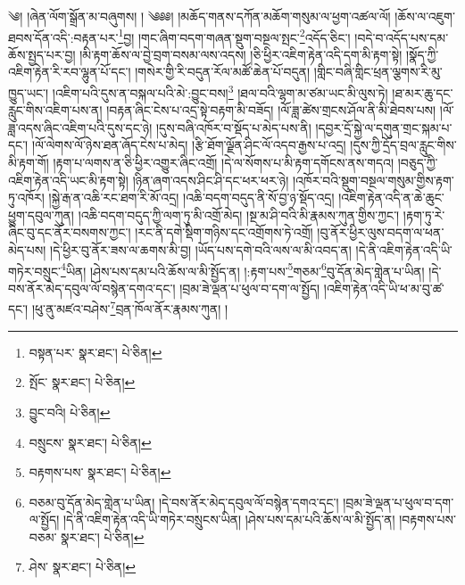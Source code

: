 \setcounter{footnote}{0} 
༄། །ཞེན་ལོག་སྒྲོན་མ་བཞུགས། ། ༄༅༅། །མཆོད་གནས་དཀོན་མཆོག་གསུམ་ལ་ཕྱག་འཚལ་ལོ། །ཆོས་ལ་འཇུག་ཐབས་དོན་འདི་:བརྟན་པར་\footnote{བསྟན་པར་  སྣར་ཐང་།  པེ་ཅིན། }བྱ། །གང་ཞིག་བདག་གཞན་སྡུག་བསྔལ་སྤང་\footnote{སྤོང་  སྣར་ཐང་།  པེ་ཅིན། }འདོད་ཅིང་། །བདེ་བ་འདོད་པས་དམ་ཆོས་སྤྱད་པར་བྱ། །མི་རྟག་ཆོས་ལ་བྱེ་བྲག་བསམ་ལས་འདས། །ཅི་ཕྱིར་འཇིག་རྟེན་འདི་དག་མི་རྟག་སྟེ། །སྣོད་ཀྱི་འཇིག་རྟེན་རི་རབ་ལྷུན་པོ་དང་། །གསེར་གྱི་རི་བདུན་རོལ་མཚོ་ཆེན་པོ་བདུན། །གླིང་བཞི་གླིང་ཕྲན་ལྕགས་རི་མུ་ཁྱུད་ཡང་། །འཇིག་པའི་དུས་ན་བསྐལ་པའི་མེ་:བྱུང་བས།\footnote{བྱུང་བའི།  པེ་ཅིན། } །ཐལ་བའི་ལྷག་མ་ཙམ་ཡང་མི་ལུས་ཏེ། །ཐ་མར་ཆུ་དང་རླུང་གིས་འཇིག་པས་ན། །བརྟན་ཞིང་ངེས་པ་འདྲ་སྟེ་བརྟག་མི་བཟོད། །ལོ་ཟླ་ཚེས་གྲངས་ཤོལ་ནི་མི་ཐེབས་པས། །ལོ་ཟླ་འདས་ཞིང་འཇིག་པའི་དུས་དང་ཉེ། །དུས་བཞི་འཁོར་བ་སྡོད་པ་མེད་པས་ནི། །དབྱར་དྲོ་སྐྱེ་ལ་དགུན་གྲང་སྐམ་པ་དང་། །ལོ་ལེགས་ལོ་ཉེས་ཐན་ཞོད་ངེས་པ་མེད། །རྩི་ཐོག་ལྗོན་ཤིང་ལོ་འདབ་རྒྱས་པ་འདྲ། །དུས་ཀྱི་དྲོད་བྲལ་རླུང་གིས་མི་རྟག་གོ། །རྟག་པ་ལགས་ན་ཅི་ཕྱིར་འགྱུར་ཞིང་འགྲོ། །དེ་ལ་སོགས་པ་མི་རྟག་དགོངས་ནས་གདའ། །བཅུད་ཀྱི་འཇིག་རྟེན་འདི་ཡང་མི་རྟག་སྟེ། །ཉིན་ཞག་འདས་ཤིང་ཤི་དང་ཕར་ཕར་ཉེ། །འཁོར་བའི་སྡུག་བསྔལ་གསུམ་གྱིས་རྟག་ཏུ་འཁོར། །སྐྱེ་རྒ་ན་འཆི་རང་ཐག་རི་མོ་འདྲ། །འཆི་བདག་བདུད་ནི་སོ་བྱ་ཉ་སྡོད་འདྲ། །འཇིག་རྟེན་འདི་ན་ཆེ་ཆུང་ཕྱུག་དབུལ་ཀུན། །འཆི་བདག་བདུད་ཀྱི་ལག་ཏུ་མི་འགྲོ་མེད། །སྔ་མ་ཤི་བའི་མི་རྣམས་ཀུན་གྱིས་ཀྱང་། །རྟག་ཏུ་རེ་ཞིང་བུ་དང་ནོར་བསགས་ཀྱང་། །རང་ནི་དགེ་སྡིག་གཉིས་དང་འགྲོགས་ཏེ་འགྲོ། །བུ་ནོར་ཕྱིར་ལུས་བདག་ལ་ཕན་མེད་པས། །དེ་ཕྱིར་བུ་ནོར་ཟས་ལ་ཆགས་མི་བྱ། །ཡོད་པས་དགེ་བའི་ལས་ལ་མི་འབད་ན། །དེ་ནི་འཇིག་རྟེན་འདི་ཡི་གཏེར་བསྲུང་\footnote{བསྲུངས་  སྣར་ཐང་།  པེ་ཅིན། }ཡིན། །ཤེས་པས་དམ་པའི་ཆོས་ལ་མི་སྤྱོད་ན། །:རྟག་པས་\footnote{བརྟགས་པས་  སྣར་ཐང་།  པེ་ཅིན། }གཅམ་\footnote{བཅམ་བུ་དོན་མེད་གླེན་པ་ཡིན། །དེ་བས་ནོར་མེད་དབུལ་ལོ་བསྙེན་དགའ་དང་། །བྲམ་ཟེ་ལྡན་པ་ཕུལ་བ་དག་ལ་སྤྱོད། །དེ་ནི་འཇིག་རྟེན་འདི་ཡི་གཏེར་བསྲུངས་ཡིན། །ཤེས་པས་དམ་པའི་ཆོས་ལ་མི་སྤྱོད་ན། །བརྟགས་པས་བཅམ་  སྣར་ཐང་།  པེ་ཅིན། }བུ་དོན་མེད་གླེན་པ་ཡིན། །དེ་བས་ནོར་མེད་དབུལ་ལོ་བསྙེན་དགའ་དང་། །བྲམ་ཟེ་ལྡན་པ་ཕུལ་བ་དག་ལ་སྤྱོད། །འཇིག་རྟེན་འདི་ཡི་ཕ་མ་བུ་ཚ་དང་། །ཕུ་ནུ་མཛའ་བཤེས་\footnote{ཤེས་  སྣར་ཐང་།  པེ་ཅིན། }བྲན་ཁོལ་ནོར་རྣམས་ཀུན། །
